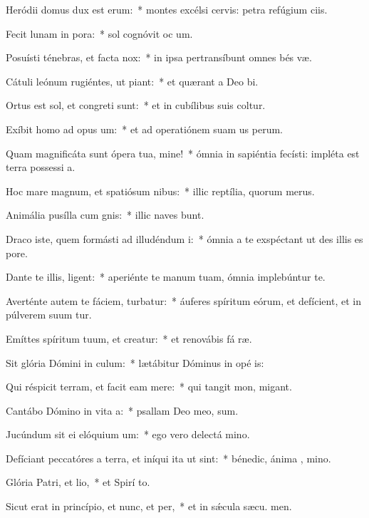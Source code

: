 \item Heródii domus dux est erum:~* montes excélsi cervis: petra refúgium ciis.
\item Fecit lunam in pora:~* sol cognóvit oc um.
\item Posuísti ténebras, et facta  nox:~* in ipsa pertransíbunt omnes bés væ.
\item Cátuli leónum rugiéntes, ut piant:~* et quærant a Deo  bi.
\item Ortus est sol, et congreti sunt:~* et in cubílibus suis coltur.
\item Exíbit homo ad opus um:~* et ad operatiónem suam us  perum.
\item Quam magnificáta sunt ópera tua, mine!~* ómnia in sapiéntia fecísti: impléta est terra possessi a.
\item Hoc mare magnum, et spatiósum nibus:~* illic reptília, quorum   merus.
\item Animália pusílla cum gnis:~* illic naves bunt.
\item Draco iste, quem formásti ad illudéndum i:~* ómnia a te exspéctant ut des illis es  pore.
\item Dante te illis, ligent:~* aperiénte te manum tuam, ómnia implebúntur te.
\item Averténte autem te fáciem, turbatur:~* áuferes spíritum eórum, et defícient, et in púlverem suum tur.
\item Emíttes spíritum tuum, et creatur:~* et renovábis fá ræ.
\item Sit glória Dómini in culum:~* lætábitur Dóminus in opé is:
\item Qui réspicit terram, et facit eam mere:~* qui tangit mon,  migant.
\item Cantábo Dómino in vita a:~* psallam Deo meo,  sum.
\item Jucúndum sit ei elóquium um:~* ego vero delectá  mino.
\item Defíciant peccatóres a terra, et iníqui ita ut  sint:~* bénedic, ánima , mino.
\item Glória Patri, et lio,~* et Spirí to.
\item Sicut erat in princípio, et nunc, et per,~* et in sǽcula sæcu. men.
